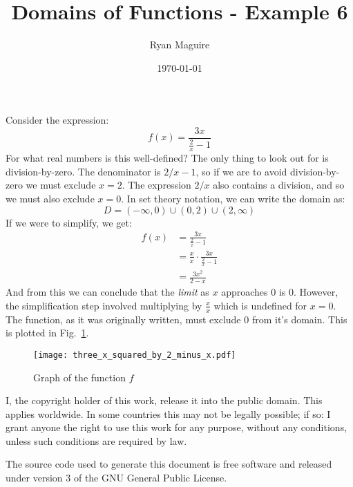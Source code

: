 \documentclass{article}
\title{Domains of Functions - Example 6}
\author{Ryan Maguire}
\date{\today}
\begin{document}
    \maketitle
    Consider the expression:
    \begin{equation}
        f(x)=\frac{3x}{\frac{2}{x}-1}
    \end{equation}
    For what real numbers is this well-defined? The only thing to look out for
    is division-by-zero. The denominator is $2/x-1$, so if we are to avoid
    division-by-zero we must exclude $x=2$. The expression $2/x$ also
    contains a division, and so we must also exclude $x=0$. In set theory
    notation, we can write the domain as:
    \begin{equation}
        D=(-\infty,0)\cup(0,2)\cup(2,\infty)
    \end{equation}
    If we were to simplify, we get:
    \begin{align}
        f(x)&=\frac{3x}{\frac{2}{x}-1}\\
            &=\frac{x}{x}\cdot\frac{3x}{\frac{2}{x}-1}\\
            &=\frac{3x^{2}}{2-x}
    \end{align}
    And from this we can conclude that the \textit{limit} as $x$ approaches
    0 is 0. However, the simplification step involved multiplying by
    $\frac{x}{x}$ which is undefined for $x=0$. The function, as it was
    originally written, must exclude 0 from it's domain. This is
    plotted in Fig.~\ref{fig:graph_of_func}.
    \begin{figure}
        \centering
        \texttt{[image: three\_x\_squared\_by\_2\_minus\_x.pdf]}
        \caption{Graph of the function $f$}
        \label{fig:graph_of_func}
    \end{figure}
    \newpage
    I, the copyright holder of this work, release it into the public domain.
    This applies worldwide. In some countries this may not be legally possible;
    if so: I grant anyone the right to use this work for any purpose, without
    any conditions, unless such conditions are required by law.
    \par\hfill\par
    The source code used to generate this document is free software and released
    under version 3 of the GNU General Public License.
\end{document}
